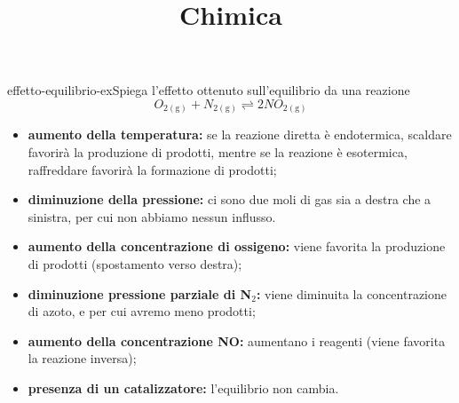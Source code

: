 \documentclass[preview]{standalone}
\begin{document}
\title{Chimica}
\genpage

\begin{snippetexercise}{effetto-equilibrio-ex}{Spiega l'effetto ottenuto sull'equilibrio da una reazione}
    \[ O_{2(\text{g})} + N_{2(\text{g})} \rightleftharpoons 2NO_{2(\text{g})} \]
    \begin{itemize}
        \item \textbf{aumento della temperatura:}
            se la reazione diretta è endotermica, scaldare favorirà la produzione di prodotti,
            mentre se la reazione è esotermica, raffreddare favorirà la formazione di prodotti;
        \item \textbf{diminuzione della pressione:}
            ci sono due moli di gas sia a destra che a sinistra, per cui non abbiamo nessun influsso.
        \item \textbf{aumento della concentrazione di ossigeno:}
            viene favorita la produzione di prodotti (spostamento verso destra);
        \item \textbf{diminuzione pressione parziale di N\({}_2\):}
            viene diminuita la concentrazione di azoto, e per cui avremo meno prodotti;
        \item \textbf{aumento della concentrazione NO:}
            aumentano i reagenti (viene favorita la reazione inversa);
        \item \textbf{presenza di un catalizzatore:}
            l'equilibrio non cambia.
    \end{itemize}
\end{snippetexercise}
\end{document}
